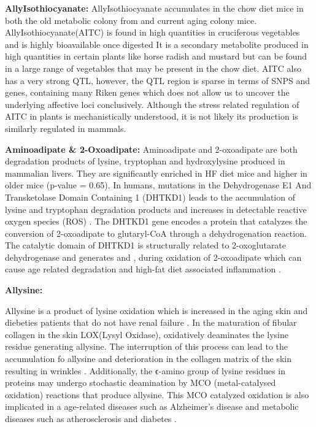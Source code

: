 \documentclass[a4paper]{book}
\begin{document}
	\textbf{AllyIsothiocyanate:}
	AllyIsothiocyanate accumulates in the chow diet mice in both the old metabolic colony from \citep{Williams2016SystemsFunction} and current aging colony mice. AllyIsothiocyanate(AITC) is found in high quantities in cruciferous vegetables and is highly bioavailable once digested \citep{Zlatkis1971ProfileUrine.} It is a secondary metabolite produced in high quantities in certain plants like horse radish and mustard but can be found in a large range of vegetables that may be present in the chow diet. AITC also has a very strong QTL, however, the QTL region is sparse in terms of SNPS and genes, containing many Riken genes which does not allow us to uncover the underlying affective loci conclusively. Although the stress related regulation of AITC in plants is mechanistically understood, it is not likely its production is similarly regulated in mammals\citep{Kissen2016Allylisothiocyanate}.  
	
	\textbf{Aminoadipate \& 2-Oxoadipate:}
	Aminoadipate and 2-oxoadipate are both degradation products of lysine, tryptophan and hydroxylysine produced in mammalian livers\citep{Higashino1965Saccharopine}. They are significantly enriched in HF diet mice and higher in older mice (p-value = 0.65). In humans, mutations in the Dehydrogenase E1 And Transketolase Domain Containing 1 (DHTKD1) leads to the accumulation of lysine and tryptophan degradation products and increases in detectable reactive oxygen species (ROS) \citep{Goncalves2016Production}. The DHTKD1 gene encodes a protein that catalyzes the conversion of 2-oxoadipate to glutaryl-CoA through a dehydrogenation reaction. The catalytic domain of DHTKD1 is structurally related to 2-oxoglutarate dehydrogenase and generates  and , during oxidation of 2-oxoadipate which can cause age related degradation and high-fat diet associated inflammation \citep{Goncalves2016Production}. 
	
	\textbf{Allysine:}
	
	Allysine is a product of lysine oxidation which is increased in the aging skin and diebeties patients that do not have renal failure \citep{Sell20072aminoadipic}.  In the maturation of  fibular collagen in the skin LOX(Lysyl Oxidase),  oxidatively deaminates the lysine residue generating allysine. The interruption of this process can lead to the accumulation fo allysine and deterioration in the collagen matrix of the skin resulting in wrinkles \citep{Bailey1998Mechanisms}. Additionally,  the ϵ-amino group of lysine residues in proteins may undergo stochastic deamination by MCO (metal-catalysed oxidation) reactions  that produce allysine. This MCO catalyzed oxidation is also implicated in a age-related diseases such as  Alzheimer's disease and metabolic diseases such as atherosclerosis and diabetes \citep{Stadtman2004Role}. 
\end{document}
